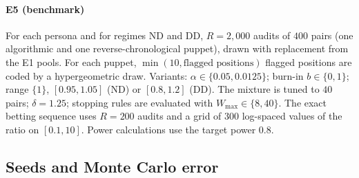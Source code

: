 \paragraph{E5 (benchmark)} For each persona and for regimes ND and DD, $R=2{,}000$ audits of $400$ pairs (one algorithmic and one reverse-chronological puppet), drawn with replacement from the E1 pools. For each puppet, $\min(10,\text{flagged positions})$ flagged positions are coded by a hypergeometric draw. Variants: $\alpha\in\{0.05,0.0125\}$; burn-in $b\in\{0,1\}$; range $\{1\}$, $[0.95,1.05]$ (ND) or $[0.8,1.2]$ (DD). The mixture is tuned to $40$ pairs; $\delta=1.25$; stopping rules are evaluated with $W_{\max}\in\{8,40\}$. The exact betting sequence uses $R=200$ audits and a grid of $300$ log-spaced values of the ratio on $[0.1,10]$. Power calculations use the target power $0.8$.

\subsection{Seeds and Monte Carlo error}\label{app:sim-seeds}

